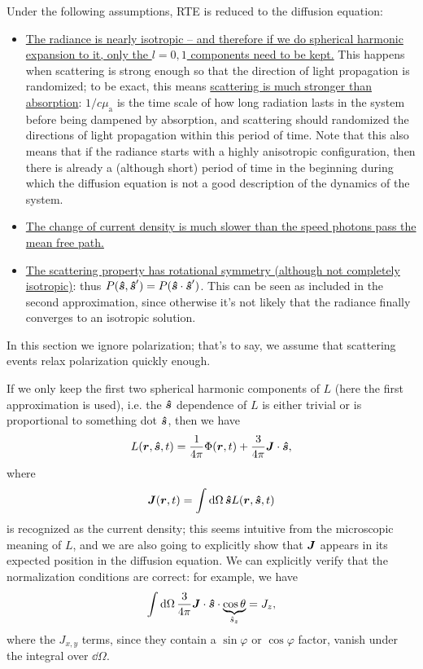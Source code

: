 \documentclass[hyperref, a4paper]{article}
\begin{document}
Under the following assumptions, RTE is reduced to the diffusion equation: 
\begin{itemize}
    \item \ul{The radiance is nearly isotropic 
    -- and therefore if we do spherical harmonic expansion to it, 
    only the $l = 0, 1$ components need to be kept.} 
    This happens when scattering is strong enough 
    so that the direction of light propagation 
    is randomized; 
    to be exact, this means \ul{scattering is much stronger than absorption}:
    $1 / c \mu_{\text{a}}$ is the time scale of 
    how long radiation lasts in the system before being dampened by absorption, 
    and scattering should randomized the directions of light propagation 
    within this period of time. 
    Note that this also means that if the radiance starts with a highly 
    anisotropic configuration, 
    then there is already a (although short) period of time in the beginning 
    during which the diffusion equation is not a good description 
    of the dynamics of the system. 
    \item \ul{The change of current density is much slower 
    than the speed photons pass the mean free path.}
    \item \ul{The scattering property has rotational symmetry (although not completely isotropic)}:
        thus $P(\vu*{s}, \vu*{s}') = P(\vu*{s} \cdot \vu*{s}')$.
        This can be seen as included in the second approximation, 
        since otherwise it's not likely that the radiance finally converges to 
        an isotropic solution.
\end{itemize}

In this section we ignore polarization;
that's to say, we assume that scattering events 
relax polarization quickly enough.

If we only keep the first two spherical harmonic components of $L$
(here the first approximation is used), 
i.e. the $\vu*{s}$ dependence of $L$ 
is either trivial 
or is proportional to something dot $\vu*{s}$, 
then we have
\begin{equation}
    L(\vb*{r}, \vu*{s}, t) = \frac{1}{4 \pi} \Phi(\vb*{r}, t) 
    + \frac{3}{4 \pi} \vb*{J} \cdot \vu*{s},
\end{equation}
where 
\begin{equation}
    \vb*{J}(\vb*{r}, t) = \int \dd{\Omega} \vu*{s} L(\vb*{r}, \vu*{s}, t)
\end{equation}
is recognized as the current density; 
this seems intuitive from the microscopic meaning of $L$,
and we are also going to explicitly show that $\vb*{J}$
appears in its expected position in the diffusion equation.
We can explicitly verify that the normalization conditions are correct: 
for example, we have 
\begin{equation}
    \int \dd{\Omega} \frac{3}{4 \pi} \vb*{J} \cdot \vu*{s} \cdot \underbrace{\cos \theta}_{\hat{s}_z} = 
    J_z, 
\end{equation} 
where the $J_{x, y}$ terms, since they contain a $\sin \varphi$ or $\cos \varphi$ factor, 
vanish under the integral over $\dd \Omega$. 
\end{document}
